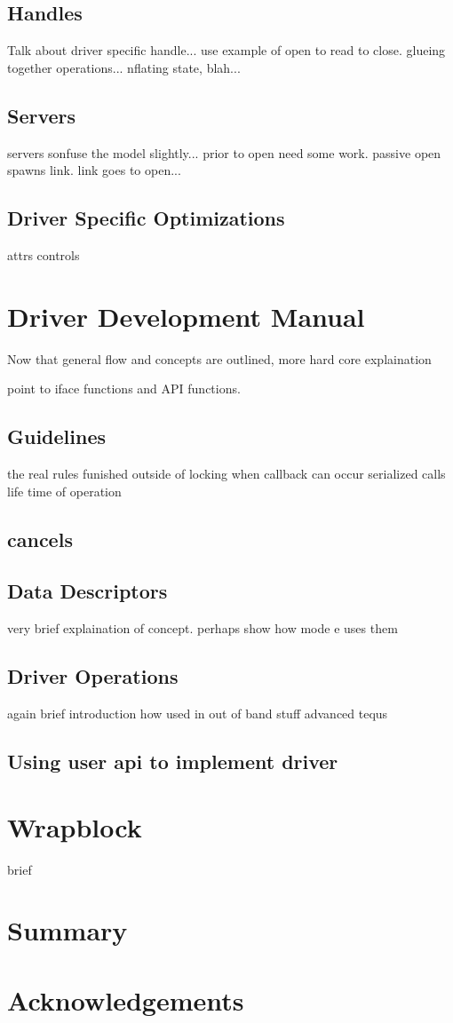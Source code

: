 \documentclass[11pt]{article}
\begin{document}
\subsection{Handles}
Talk about driver specific handle...  use example of open to 
read to close.
glueing together operations... nflating state, blah...

\subsection{Servers}
servers sonfuse the model slightly... prior to open need some work.  passive
open spawns link.  link goes to open...

\subsection{Driver Specific Optimizations}
attrs
controls

\section{Driver Development Manual}
Now that general flow and concepts are outlined, more hard core explaination

point to iface functions and API functions.

\subsection{Guidelines}
the real rules
funished outside of locking
when callback can occur
serialized calls
life time of operation

\subsection{cancels}

\subsection{Data Descriptors}
very brief explaination of concept.  perhaps show how mode e uses them

\subsection{Driver Operations}
again brief introduction
how used in out of band stuff
advanced tequs

\subsection{Using user api to implement driver}

\section{Wrapblock}
brief

\section{Summary}

\section*{Acknowledgements}
\end{document}
